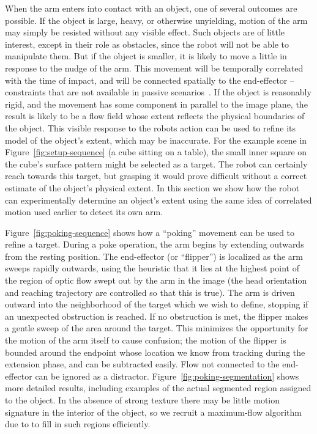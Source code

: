 When the arm enters into contact with an object, one of several
outcomes are possible.  If the object is large, heavy, or otherwise
unyielding, motion of the arm may simply be resisted without any
visible effect.  Such objects are of little interest, except in their
role as obstacles, since the robot will not be able to manipulate
them.  But if the object is smaller, it is likely to move a little in
response to the nudge of the arm.  This movement will be temporally
correlated with the time of impact, and will be connected spatially to
the end-effector -- constraints that are not available in passive
scenarios~\cite{birchfield99depth}.  If the object is reasonably
rigid, and the movement has some component in parallel to the image
plane, the result is likely to be a flow field whose extent reflects
the physical boundaries of the object.  This visible response to
the robots action can be used to refine its model of the object's
extent, which may be inaccurate.  For the example scene in
Figure~\ref{fig:setup-sequence} (a cube sitting on a table), the small
inner square on the cube's surface pattern might be selected as a
target.  The robot can certainly reach towards this target, but
grasping it would prove difficult without a correct estimate of the
object's physical extent.  In this section we show how the robot can
experimentally determine an object's extent using the same idea of
correlated motion used earlier to detect its own arm.

Figure~\ref{fig:poking-sequence} shows how a ``poking'' movement can
be used to refine a target.  During a poke operation, the arm begins
by extending outwards from the resting position.  The end-effector (or
``flipper'') is localized as the arm sweeps rapidly outwards, using
the heuristic that it lies at the highest point of the region of optic
flow swept out by the arm in the image (the head orientation and
reaching trajectory are controlled so that this is true).  The arm is
driven outward into the neighborhood of the target which we wish to
define, stopping if an unexpected obstruction is reached.  If no
obstruction is met, the flipper makes a gentle sweep of the area
around the target.  This minimizes the opportunity for the motion of
the arm itself to cause confusion; the motion of the flipper is
bounded around the endpoint whose location we know from tracking
during the extension phase, and can be subtracted easily.  Flow not
connected to the end-effector can be ignored as a distractor.
Figure~\ref{fig:poking-segmentation} shows more detailed results,
including examples of the actual segmented region assigned to the
object.  In the absence of strong texture there may be little motion
signature in the interior of the object, so we recruit a maximum-flow
algorithm due to \cite{boykov01experimental} to fill in such regions
efficiently.

